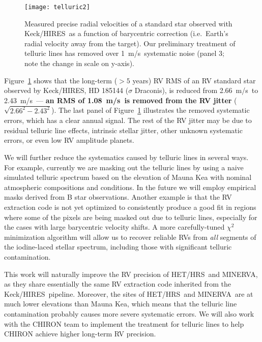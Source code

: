 \documentclass[12pt]{article}
\def\mps{m/s}
\def\minerva{MINERVA}
\def\hrs{HET/HRS}
\def\keck{Keck/HIRES}
\begin{document}
\begin{figure}[thb]
  \vspace{-3pt}
  \begin{center}
    \texttt{[image: telluric2]}
  \end{center}
  \vspace{-25pt}  
  \caption{Measured precise radial velocities of a standard star
    observed with \keck\ as a function of barycentric correction
    (i.e.~Earth's radial velocity away from the target). Our
    preliminary treatment of telluric lines has removed over
    1~\mps\ systematic noise (panel 3; note the change in scale on
    y-axis).} 
  \vspace{-8pt}  
  \label{fig:tell}
\end{figure}

Figure~\ref{fig:tell} shows that the long-term ($> 5$ years) RV RMS of
an RV standard star observed by \keck, HD 185144 ($\sigma$ Draconis),
is reduced from 2.66~\mps\ to 2.43~\mps\ --- \textbf{an RMS of
  1.08~\mps\ is removed from the RV jitter}
($\sqrt{2.66^2-2.43^2}$). The last panel of Figure~\ref{fig:tell}
illustrates the removed systematic errors, which has a clear annual
signal. The rest of the RV jitter may be due to residual telluric line
effects, intrinsic stellar jitter, other unknown systematic errors, or
even low RV amplitude planets.

We will further reduce the systematics caused by telluric lines in
several ways. For example, currently we are masking out the telluric
lines by using a naive simulated telluric spectrum based on the
elevation of Mauna Kea with nominal atmospheric compositions and
conditions. In the future we will employ empirical masks derived from
B star observations. Another example is that the RV extraction code is
not yet optimized to consistently produce a good fit in regions where
some of the pixels are being masked out due to telluric lines,
especially for the cases with large barycentric velocity shifts. A
more carefully-tuned $\chi^2$ minimization algorithm will allow us to
recover reliable RVs from \textit{all} segments of the iodine-laced
stellar spectrum, including those with significant telluric
contamination.

This work will naturally improve the RV precision of \hrs\ and
\minerva, as they share essentially the same RV extraction code
inherited from the \keck\ pipeline. Moreover, the sites of \hrs\ and
\minerva\ are at much lower elevations than Mauna Kea, which means
that the telluric line contamination probably causes more severe
systematic errors. We will also work with the CHIRON team to implement
the treatment for telluric lines to help CHIRON achieve higher
long-term RV precision.
\end{document}
